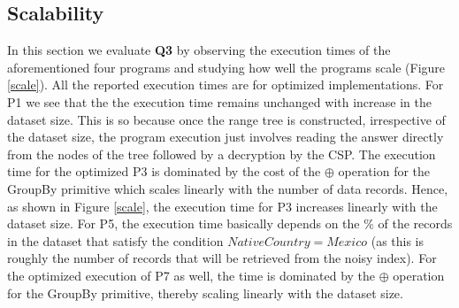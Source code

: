  \subsection*{Scalability}
 In this section we evaluate \textbf{Q3} by observing the execution times of the aforementioned four \system programs and studying how well the programs scale (Figure \ref{scale}). All the reported execution times are for optimized implementations. For P1 we see that the the execution time remains unchanged with increase in the dataset size. This is so because once the range tree is constructed, irrespective of the dataset size, the program execution just involves reading the answer directly from the nodes of the tree followed by a decryption by the \textsf{CSP}. The execution time for the optimized P3 is dominated by the cost of the $\oplus$ operation for the \textsf{GroupBy} primitive which scales linearly with the number of data records. Hence, as shown in Figure \ref{scale}, the execution time for P3 increases linearly with the dataset size. For P5, the execution time basically depends on the \% of the records in the dataset that satisfy the condition $NativeCountry=Mexico$ (as this is roughly the number of records that will be retrieved from the noisy index). %
 For the optimized execution of P7  as well, the time is dominated by the $\oplus$ operation for the \textsf{GroupBy} primitive, thereby scaling linearly with the dataset size.   %
